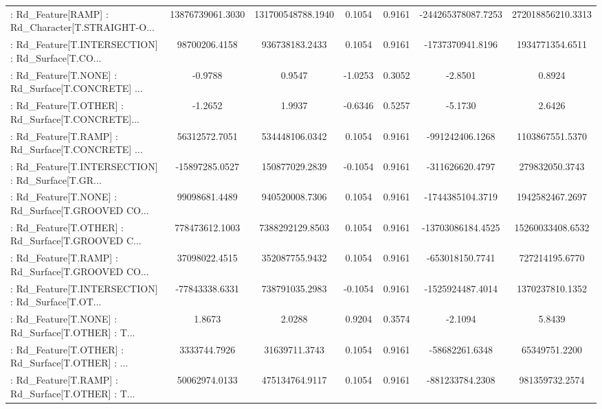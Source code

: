 \begin{longtable}{p{4cm}cccccc}
 : Rd\_Feature[RAMP] : Rd\_Character[T.STRAIGHT-O... &  13876739061.3030 & 131700548788.1940 &  0.1054 &       0.9161 & -244265378087.7253 & 272018856210.3313 \\
 : Rd\_Feature[T.INTERSECTION] : Rd\_Surface[T.CO... &     98700206.4158 &    936738183.2433 &  0.1054 &       0.9161 &   -1737370941.8196 &   1934771354.6511 \\
 : Rd\_Feature[T.NONE] : Rd\_Surface[T.CONCRETE] ... &           -0.9788 &            0.9547 & -1.0253 &       0.3052 &            -2.8501 &            0.8924 \\
 : Rd\_Feature[T.OTHER] : Rd\_Surface[T.CONCRETE]... &           -1.2652 &            1.9937 & -0.6346 &       0.5257 &            -5.1730 &            2.6426 \\
 : Rd\_Feature[T.RAMP] : Rd\_Surface[T.CONCRETE] ... &     56312572.7051 &    534448106.0342 &  0.1054 &       0.9161 &    -991242406.1268 &   1103867551.5370 \\
 : Rd\_Feature[T.INTERSECTION] : Rd\_Surface[T.GR... &    -15897285.0527 &    150877029.2839 & -0.1054 &       0.9161 &    -311626620.4797 &    279832050.3743 \\
 : Rd\_Feature[T.NONE] : Rd\_Surface[T.GROOVED CO... &     99098681.4489 &    940520008.7306 &  0.1054 &       0.9161 &   -1744385104.3719 &   1942582467.2697 \\
 : Rd\_Feature[T.OTHER] : Rd\_Surface[T.GROOVED C... &    778473612.1003 &   7388292129.8503 &  0.1054 &       0.9161 &  -13703086184.4525 &  15260033408.6532 \\
 : Rd\_Feature[T.RAMP] : Rd\_Surface[T.GROOVED CO... &     37098022.4515 &    352087755.9432 &  0.1054 &       0.9161 &    -653018150.7741 &    727214195.6770 \\
 : Rd\_Feature[T.INTERSECTION] : Rd\_Surface[T.OT... &    -77843338.6331 &    738791035.2983 & -0.1054 &       0.9161 &   -1525924487.4014 &   1370237810.1352 \\
 : Rd\_Feature[T.NONE] : Rd\_Surface[T.OTHER] : T... &            1.8673 &            2.0288 &  0.9204 &       0.3574 &            -2.1094 &            5.8439 \\
 : Rd\_Feature[T.OTHER] : Rd\_Surface[T.OTHER] : ... &      3333744.7926 &     31639711.3743 &  0.1054 &       0.9161 &     -58682261.6348 &     65349751.2200 \\
 : Rd\_Feature[T.RAMP] : Rd\_Surface[T.OTHER] : T... &     50062974.0133 &    475134764.9117 &  0.1054 &       0.9161 &    -881233784.2308 &    981359732.2574 \\

\end{longtable}
